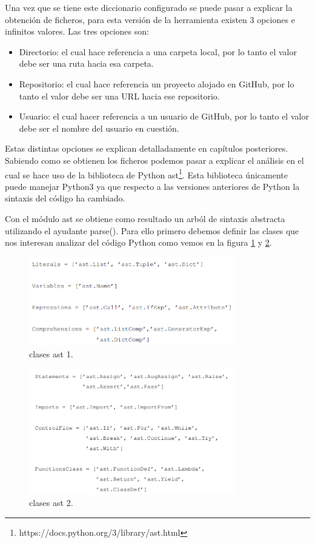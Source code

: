 \documentclass[a4paper, 12pt]{book}
\begin{document}
Una vez que se tiene este diccionario configurado se puede pasar a explicar la obtención de ficheros, para esta versión de la herramienta existen 3 opciones e infinitos valores. Las tres opciones son:

\begin{itemize}
	\item Directorio: el cual hace referencia a una carpeta local, por lo tanto el valor debe ser una ruta hacia esa carpeta.
	\item Repositorio: el cual hace referencia un proyecto alojado en GitHub, por lo tanto el valor debe ser una URL hacia ese repositorio.
	\item Usuario: el cual hacer referencia a un usuario de GitHub, por lo tanto el valor debe ser el nombre del usuario en cuestión.
\end{itemize}

Estas distintas opciones se explican detalladamente en capítulos posteriores. Sabiendo como se obtienen los ficheros podemos pasar a explicar el análisis en el cual se hace uso de la biblioteca de Python ast\footnote{https://docs.python.org/3/library/ast.html}. Esta biblioteca únicamente puede manejar Python3 ya que respecto a las versiones anteriores de Python la sintaxis del código ha cambiado.

Con el módulo ast se obtiene como resultado un arból de sintaxis abstracta utilizando el ayudante parse(). Para ello primero debemos definir las clases que nos interesan analizar del código Python como vemos en la figura \ref{fig:ast1} y \ref{fig:ast2}.


\begin{figure}
  \centering
  \includegraphics[width=9cm, keepaspectratio]{img/ast1.png}
  \caption{clases ast 1.}\label{fig:ast1}
\end{figure}

\begin{figure}
  \centering
  \includegraphics[width=9cm, keepaspectratio]{img/ast2.png}
  \caption{clases ast 2.}\label{fig:ast2}
\end{figure}
\end{document}

